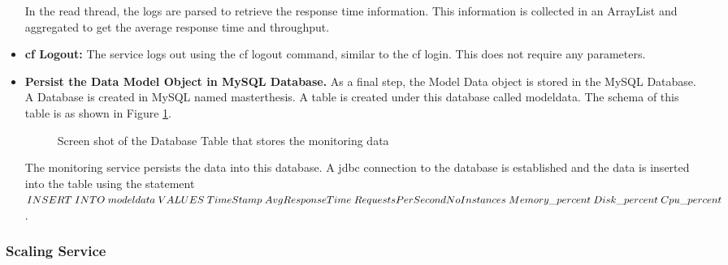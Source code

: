 \documentclass[article,type=msc,colorback,12pt,accentcolor=tud8b,table]{tudthesis}
\begin{document}
\begin{itemize}
In the read thread, the logs are parsed to retrieve the response time information. This information is collected in an ArrayList and aggregated to get the average response time and throughput. 
		
\item{\textbf{\gls{cf} Logout:}} The service logs out using the cf logout command, similar to the cf login. This does not require any parameters.
		
\item{\textbf{Persist the Data Model Object in MySQL Database.}} As  a final step, the Model Data object is stored in the MySQL Database. A Database is created in MySQL named masterthesis. A table is created under this database called modeldata. The schema of this table is as shown in Figure \ref{fig:database_schema_screenshot}.

 \begin{figure}[h]
 	\begin{center}
 		\makebox[\textwidth]{\texttt{[image: D5]}}
 	\end{center}
 	\caption{Screen shot of the Database Table that stores the monitoring data}
 	\label{fig:database_schema_screenshot}
 \end{figure}	

The monitoring service persists the data into this database. A \gls{jdbc} connection to the database is established and the data is inserted into the table using the statement $INSERT\; INTO \;modeldata \;VALUES \;TimeStamp \;AvgResponseTime \;RequestsPerSecond \\ 
NoInstances \;Memory\_percent\; Disk\_percent \; Cpu\_percent$.

		
\end{itemize}	
\subsubsection{Scaling Service}
	
\end{document}
